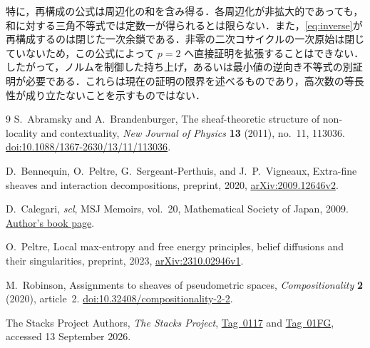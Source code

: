 \documentclass[11pt,a4paper]{article}
\numberwithin{equation}{section}
\theoremstyle{japanese}
\theoremstyle{remark}
\begin{document}
特に，再構成の公式は周辺化の和を含み得る．各周辺化が非拡大的であっても，和に対する三角不等式では定数一が得られるとは限らない．また，\eqref{eq:inverse}が再構成するのは閉じた一次余鎖である．非零の二次コサイクルの一次原始は閉じていないため，この公式によって $p=2$ へ直接証明を拡張することはできない．したがって，ノルムを制御した持ち上げ，あるいは最小値の逆向き不等式の別証明が必要である．これらは現在の証明の限界を述べるものであり，高次数の等長性が成り立たないことを示すものではない．

\latinfont
\begin{thebibliography}{9}
S.~Abramsky and A.~Brandenburger,
The sheaf-theoretic structure of non-locality and contextuality,
\emph{New Journal of Physics} \textbf{13} (2011), no.~11, 113036.
\href{https://doi.org/10.1088/1367-2630/13/11/113036}{doi:10.1088/1367-2630/13/11/113036}.

D.~Bennequin, O.~Peltre, G.~Sergeant-Perthuis, and J.~P.~Vigneaux,
Extra-fine sheaves and interaction decompositions,
preprint, 2020, \href{https://arxiv.org/abs/2009.12646v2}{arXiv:2009.12646v2}.

D.~Calegari,
\emph{scl}, MSJ Memoirs, vol.~20,
Mathematical Society of Japan, 2009.
\href{https://math.uchicago.edu/~dannyc/books/scl/scl.html}{Author's book page}.

O.~Peltre,
Local max-entropy and free energy principles, belief diffusions and their singularities,
preprint, 2023, \href{https://arxiv.org/abs/2310.02946v1}{arXiv:2310.02946v1}.

M.~Robinson,
Assignments to sheaves of pseudometric spaces,
\emph{Compositionality} \textbf{2} (2020), article~2.
\href{https://doi.org/10.32408/compositionality-2-2}{doi:10.32408/compositionality-2-2}.

The Stacks Project Authors,
\emph{The Stacks Project},
\href{https://stacks.math.columbia.edu/tag/0117}{Tag~0117} and
\href{https://stacks.math.columbia.edu/tag/01FG}{Tag~01FG}, accessed 13 September 2026.
\end{thebibliography}
\end{document}
